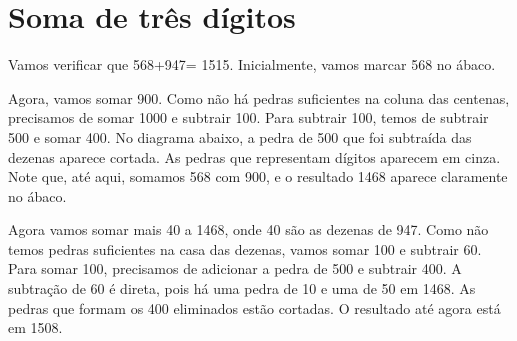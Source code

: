 \documentclass[12pt]{book}
\begin{document}
\section{Soma de três dígitos}
Vamos verificar que 568+947= 1515. Inicialmente,
vamos marcar 568 no ábaco.\\


Agora, vamos somar 900. Como não há pedras suficientes
na coluna das centenas, precisamos de somar 1000
e subtrair 100. Para subtrair 100, temos de
subtrair 500 e somar 400. No diagrama abaixo,
a pedra de 500 que foi subtraída das dezenas
aparece cortada. As pedras que representam
dígitos aparecem em cinza. Note que, até aqui,
somamos 568 com 900, e o resultado 1468
aparece claramente no ábaco.


Agora vamos somar mais 40 a 1468, onde 40 são as
dezenas de 947. Como não temos pedras suficientes
na casa das dezenas, vamos somar 100 e subtrair
60. Para somar 100, precisamos de adicionar a
pedra de 500 e subtrair 400. A subtração de
60 é direta, pois há uma pedra de 10 e uma de
50 em 1468. As pedras que
formam os 400 eliminados estão cortadas.
O resultado até agora está em 1508.\\
\end{document}
